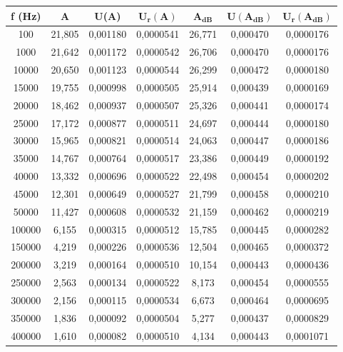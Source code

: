 \begin{table}[!ht]
    \centering
    \begin{tabular}{|c|c|c|c|c|c|c|}
    \hline
        \textbf{f (Hz)} & \textbf{A} & \textbf{U(A)} & $\bm{U_r(A)}$ & $\bm{A_{dB}}$ & $\bm{U(A_{dB})}$ & $\bm{U_r(A_{dB})}$ \\ \hline
        100 & 21,805 & 0,001180 & 0,0000541 & 26,771 & 0,000470 & 0,0000176 \\ \hline
        1000 & 21,642 & 0,001172 & 0,0000542 & 26,706 & 0,000470 & 0,0000176 \\ \hline
        10000 & 20,650 & 0,001123 & 0,0000544 & 26,299 & 0,000472 & 0,0000180 \\ \hline
        15000 & 19,755 & 0,000998 & 0,0000505 & 25,914 & 0,000439 & 0,0000169 \\ \hline
        20000 & 18,462 & 0,000937 & 0,0000507 & 25,326 & 0,000441 & 0,0000174 \\ \hline
        25000 & 17,172 & 0,000877 & 0,0000511 & 24,697 & 0,000444 & 0,0000180 \\ \hline
        30000 & 15,965 & 0,000821 & 0,0000514 & 24,063 & 0,000447 & 0,0000186 \\ \hline
        35000 & 14,767 & 0,000764 & 0,0000517 & 23,386 & 0,000449 & 0,0000192 \\ \hline
        40000 & 13,332 & 0,000696 & 0,0000522 & 22,498 & 0,000454 & 0,0000202 \\ \hline
        45000 & 12,301 & 0,000649 & 0,0000527 & 21,799 & 0,000458 & 0,0000210 \\ \hline
        50000 & 11,427 & 0,000608 & 0,0000532 & 21,159 & 0,000462 & 0,0000219 \\ \hline
        100000 & 6,155 & 0,000315 & 0,0000512 & 15,785 & 0,000445 & 0,0000282 \\ \hline
        150000 & 4,219 & 0,000226 & 0,0000536 & 12,504 & 0,000465 & 0,0000372 \\ \hline
        200000 & 3,219 & 0,000164 & 0,0000510 & 10,154 & 0,000443 & 0,0000436 \\ \hline
        250000 & 2,563 & 0,000134 & 0,0000522 & 8,173 & 0,000454 & 0,0000555 \\ \hline
        300000 & 2,156 & 0,000115 & 0,0000534 & 6,673 & 0,000464 & 0,0000695 \\ \hline
        350000 & 1,836 & 0,000092 & 0,0000504 & 5,277 & 0,000437 & 0,0000829 \\ \hline
        400000 & 1,610 & 0,000082 & 0,0000510 & 4,134 & 0,000443 & 0,0001071 \\ \hline

\end{tabular}
\end{table}
